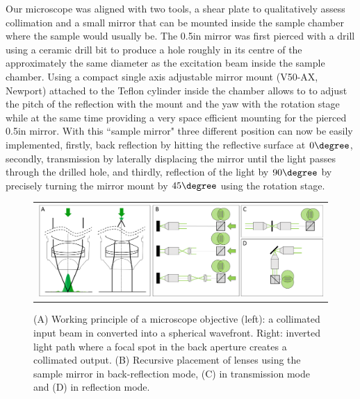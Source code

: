 \documentclass[12pt]{spieman}  %
\begin{document}
Our microscope was aligned with two tools, a shear plate to qualitatively assess collimation and a small mirror that can be mounted inside the sample chamber where the sample would usually be. The 0.5in mirror was first pierced with a drill using a ceramic drill bit to produce a hole roughly in its centre of the approximately the same diameter as the excitation beam inside the sample chamber. Using a compact single axis adjustable mirror mount (V50-AX, Newport) attached to the Teflon cylinder inside the chamber allows to to adjust the pitch of the reflection with the mount and the yaw with the rotation stage while at the same time providing a very space efficient mounting for the pierced 0.5in mirror. With this ``sample mirror" three different position can now be easily implemented, firstly, back reflection by hitting the reflective surface at $0\degree$, secondly, transmission by laterally displacing the mirror until the light passes through the drilled hole, and thirdly, reflection of the light by $90\degree$ by precisely turning the mirror mount by $45\degree$ using the rotation stage. 

\begin{figure}
   \begin{center}
   \begin{tabular}{c}
   \includegraphics[width=\textwidth]{Panel4.eps}
   \end{tabular}
   \end{center}
   \caption{\label{fig:alignment2} (A) Working principle of a microscope objective (left): a collimated input beam in converted into a spherical wavefront. Right: inverted light path where a focal spot in the back aperture creates a collimated output. (B) Recursive placement of lenses using the sample mirror in back-reflection mode, (C) in transmission mode and (D) in reflection mode.} 
   \end{figure}
\end{document}
